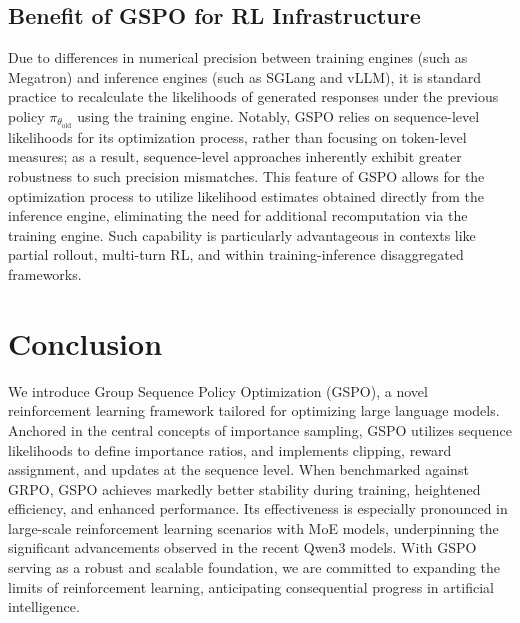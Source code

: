 \subsection{Benefit of GSPO for RL Infrastructure}

Due to differences in numerical precision between training engines (such as Megatron) and inference engines (such as SGLang and vLLM), it is standard practice to recalculate the likelihoods of generated responses under the previous policy $\pi_{\theta_\text{old}}$ using the training engine. Notably, GSPO relies on sequence-level likelihoods for its optimization process, rather than focusing on token-level measures; as a result, sequence-level approaches inherently exhibit greater robustness to such precision mismatches. This feature of GSPO allows for the optimization process to utilize likelihood estimates obtained directly from the inference engine, eliminating the need for additional recomputation via the training engine. Such capability is particularly advantageous in contexts like partial rollout, multi-turn RL, and within training-inference disaggregated frameworks.

\section{Conclusion}

We introduce Group Sequence Policy Optimization (GSPO), a novel reinforcement learning framework tailored for optimizing large language models. Anchored in the central concepts of importance sampling, GSPO utilizes sequence likelihoods to define importance ratios, and implements clipping, reward assignment, and updates at the sequence level. When benchmarked against GRPO, GSPO achieves markedly better stability during training, heightened efficiency, and enhanced performance. Its effectiveness is especially pronounced in large-scale reinforcement learning scenarios with MoE models, underpinning the significant advancements observed in the recent Qwen3 models. With GSPO serving as a robust and scalable foundation, we are committed to expanding the limits of reinforcement learning, anticipating consequential progress in artificial intelligence.

